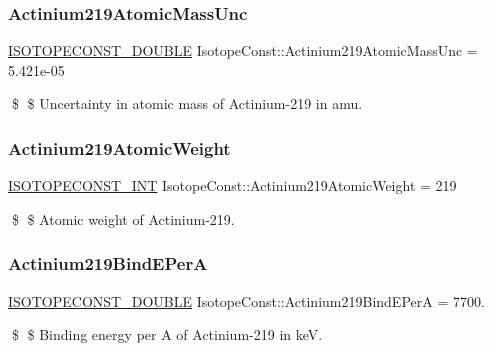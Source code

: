 \subsubsection{\texorpdfstring{Actinium219\+Atomic\+Mass\+Unc}{Actinium219AtomicMassUnc}}
{\footnotesize\ttfamily \mbox{\hyperlink{group___isotope_const-_macros_ga8f45a7272ce02c0b4c65c44636ed719a}{I\+S\+O\+T\+O\+P\+E\+C\+O\+N\+S\+T\+\_\+\+D\+O\+U\+B\+LE}} Isotope\+Const\+::\+Actinium219\+Atomic\+Mass\+Unc = 5.\+421e-\/05}

\$ \$ Uncertainty in atomic mass of Actinium-\/219 in amu. \mbox{\label{group___isotope_const-_actinium-_ac219_gaa95faf61b41278d60ad4955a8786118e}} 
\subsubsection{\texorpdfstring{Actinium219\+Atomic\+Weight}{Actinium219AtomicWeight}}
{\footnotesize\ttfamily \mbox{\hyperlink{group___isotope_const-_macros_ga5f18360b3e99483a35c32d789e62621c}{I\+S\+O\+T\+O\+P\+E\+C\+O\+N\+S\+T\+\_\+\+I\+NT}} Isotope\+Const\+::\+Actinium219\+Atomic\+Weight = 219}

\$ \$ Atomic weight of Actinium-\/219. \mbox{\label{group___isotope_const-_actinium-_ac219_gafd7f4ac4fe5034509127da43ff0b24bb}} 
\subsubsection{\texorpdfstring{Actinium219\+Bind\+E\+PerA}{Actinium219BindEPerA}}
{\footnotesize\ttfamily \mbox{\hyperlink{group___isotope_const-_macros_ga8f45a7272ce02c0b4c65c44636ed719a}{I\+S\+O\+T\+O\+P\+E\+C\+O\+N\+S\+T\+\_\+\+D\+O\+U\+B\+LE}} Isotope\+Const\+::\+Actinium219\+Bind\+E\+PerA = 7700.}

\$ \$ Binding energy per A of Actinium-\/219 in keV. \mbox{\label{group___isotope_const-_actinium-_ac219_gabf9d51a35de6efe2352e5d3a32816fb8}} 
